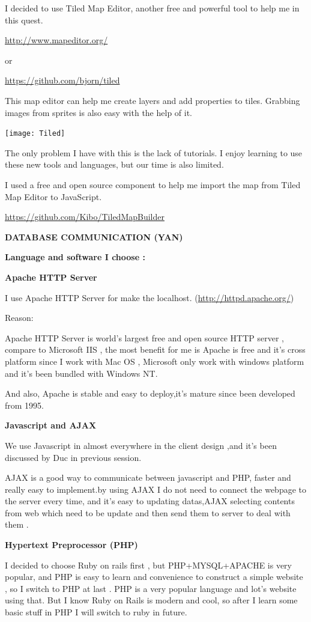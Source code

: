 \documentclass[a4wide, 11pt]{article}
\begin{document}
I decided to use Tiled Map Editor, another free and powerful tool to help me in this quest.

\url{http://www.mapeditor.org/}

or

\url{https://github.com/bjorn/tiled}

This map editor can help me create layers and add properties to tiles. Grabbing images from sprites is also easy with the help of it.

\texttt{[image: Tiled]}

The only problem I have with this is the lack of tutorials. I enjoy learning to use these new tools and languages, but our time is also limited.

I used a free and open source component to help me import the map from Tiled Map Editor to JavaScript.

\url{https://github.com/Kibo/TiledMapBuilder}


\textbf{DATABASE COMMUNICATION (YAN)}

\textbf{Language and software I choose :}

\textbf{Apache HTTP Server }

I use Apache HTTP Server for make the localhost. (\url{http://httpd.apache.org/})

Reason:

Apache HTTP Server is world’s largest free and open source HTTP server , compare to Microsoft IIS , the most benefit for me is Apache is free and it’s cross platform since I work with Mac OS , Microsoft only work with windows platform and it’s been bundled with Windows NT.

And also, Apache is stable and easy to deploy,it’s mature since been developed from 1995.  

\textbf{Javascript and AJAX}

We use Javascript in almost everywhere in the client design ,and it’s been discussed by Duc in previous session. 

AJAX is a good way to communicate between javascript and PHP, faster and really easy to implement.by using AJAX I do not need to connect the webpage to the server every time, and it’s easy to updating datas,AJAX selecting contents from web which need to be update and then send them to server to deal with them . 

\textbf{Hypertext Preprocessor (PHP)}

I decided to choose Ruby on rails first , but PHP+MYSQL+APACHE is very popular, and PHP is easy to learn and convenience to construct a simple website , so I switch to PHP at last . PHP is a very popular language and lot’s website using that. But I know Ruby on Rails is modern and cool, so after I learn some basic stuff in PHP I will switch to ruby in future.
\end{document}
